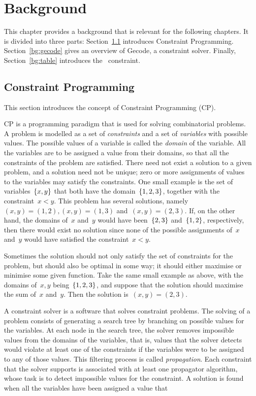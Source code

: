 \documentclass[a4paper,11pt]{article}
\newcommand{\Secref}[1]{Section~\ref{#1}}
\newcommand{\Table}{\Constraint{Table}~}
\begin{document}
\section{Background}
\label{bg}


This chapter provides a background that is relevant for the
following chapters. It is divided into three parts: \Secref{bg:cp}
introduces Constraint Programming. \Secref{bg:gecode} gives an overview
of Gecode, a constraint solver. Finally, \Secref{bg:table} introduces
the \Table constraint.

\subsection{Constraint Programming}
\label{bg:cp}
This section introduces the concept of Constraint Programming (CP).

CP is a programming paradigm that is used for solving
combinatorial problems. A problem is
modelled as a set of \emph{constraints} and a
set of \emph{variables} with possible values. The possible values of 
a variable is called the \emph{domain} of the variable.
All the variables are to be assigned a value
from their domains, so that all the constraints of the problem
are satisfied. There need not
exist a solution to a given problem, and a solution need not
be unique; zero or more assignments of values to the variables may 
satisfy the constraints.
One small example is the set of variables~$\left\{x,y\right\}$ that both have
the domain~$\left\{1,2,3\right\}$,
together with the constraint~$x<y$. This problem has several solutions, 
namely~$(x,y) = (1,2), (x,y) = (1,3)$ and~$(x,y) = (2,3)$.
If, on the other hand, the domains of~$x$ and~$y$ would have been~$\left\{2,3\right\}$
and~$\left\{1,2\right\}$, respectively, then there would exist no solution since none of
the possible assignments of~$x$ and~$y$ would have satisfied the constraint~$x<y$.

Sometimes the solution should not only satisfy the set of constraints for the
problem, but should also be optimal in some way; it should either maximise or
minimise some given function. Take the same small example as above, with
the domains of~$x,y$ being~$\left\{1,2,3\right\}$, and suppose that the solution
should maximise the sum of~$x$ and~$y$. Then the solution is~$(x,y) = (2,3)$.

A constraint solver is a software that solves constraint problems.
The solving of a problem consists of generating a search tree by branching
on possible values for the variables. At each node in the search tree,
the solver removes impossible values from the domains of the variables,
that is, values that the solver detects
would violate at least one of the constraints if the
variables were to be assigned to any of those values. This filtering
process is called \emph{propagation}. Each constraint that the solver supports
is associated with at least one propagator algorithm, whose task
is to detect impossible values for the constraint. %
A solution is found when all the variables have been assigned a value
that 
\end{document}
